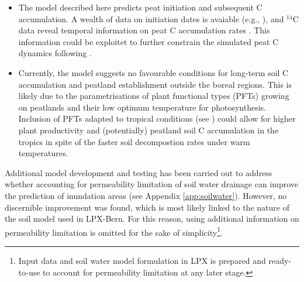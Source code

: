 \begin{itemize}
\item The model described here predicts peat initiation and subsequent C accumulation. A wealth of data on initiation dates is avaiable (e.g., \citet{mcdonald06sci}), and $^{14}$C data reveal temporal information on peat C accumulation rates \citep{yu10grl}. This information could be exploitet to further constrain the simulated peat C dynamics following \citet{spahni13cp}. 
\item Currently, the model suggests no favourable conditions for long-term soil C accumulation and peatland establishment outside the boreal regions. This is likely due to the parametrisations of plant functional types (PFTs) growing on peatlands and their low optimum temperature for photosynthesis. Inclusion of PFTs adapted to tropical conditions (see \citet{ringeval12}) could allow for higher plant productivity and (potentially) peatland soil C accumulation in the tropics in spite of the faster soil decompostion rates under warm temperatures.
\end{itemize}

Additional model development and testing has been carried out to address whether accounting for permeability limitation of soil water drainage can improve the prediction of inundation areas (see Appendix \ref{app:soilwater}). However, no discernible improvement was found, which is most likely linked to the nature of the soil model used in LPX-Bern. For this reason, using additional information on permeability limitation is omitted for the sake of simplicity\footnote{Input data and soil water model formulation in LPX is prepared and ready-to-use to account for permeability limitation at any later stage.}.\\

\clearpage





